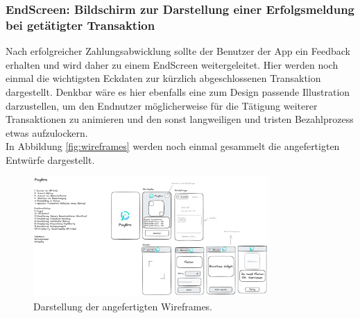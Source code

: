   \subsubsection*{EndScreen: Bildschirm zur Darstellung einer Erfolgsmeldung bei getätigter Transaktion}
  Nach erfolgreicher Zahlungsabwicklung sollte der Benutzer der App ein Feedback erhalten und wird daher zu einem EndScreen weitergeleitet.
  Hier werden noch einmal die wichtigsten Eckdaten zur kürzlich abgeschlossenen Transaktion dargestellt.
  Denkbar wäre es hier ebenfalls eine zum Design passende Illustration darzustellen, um den Endnutzer möglicherweise für die Tätigung weiterer Transaktionen zu animieren und den sonst langweiligen und tristen Bezahlprozess etwas aufzulockern.
  \\
  In Abbildung \ref{fig:wireframes} werden noch einmal gesammelt die angefertigten Entwürfe dargestellt.
  
  \begin{figure}[H]
    \centering
    \includegraphics[width=0.8\textwidth]{images/wireframes.png}
    \caption{Darstellung der angefertigten Wireframes.}
    \label{wireframes}
  \end{figure}